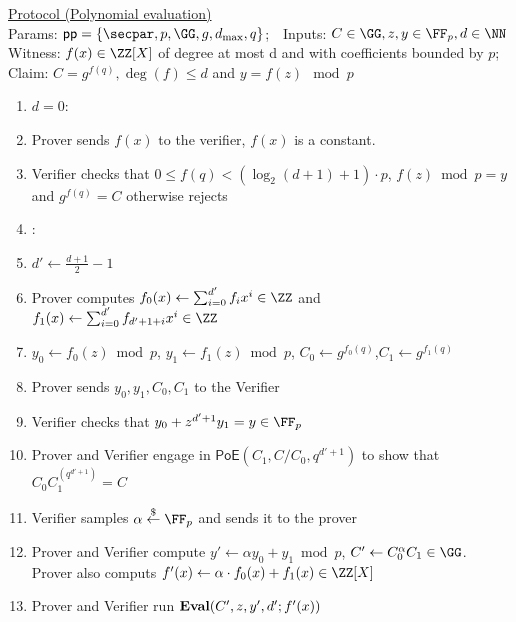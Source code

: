 \documentclass{article}
\begin{document}
\begin{small}
 \begin{minipage}{1.1\textwidth}
\begin{mdframed}[userdefinedwidth=1\textwidth]  \label{prot:Opening}
	\noindent \underline{\textsf{Protocol \eval} (Polynomial evaluation)}\\
\noindent Params: $\crs=\{\secpar,p,\GG,g,d_{\max},q\}$;\ \
Inputs: $C\in \GG,z,y\in \FF_p,d \in \NN $\\
Witness: $f(x) \in \ZZ[X]$ of degree at most d and with coefficients bounded by $p$;\\ 
Claim: $C=g^{f(q)},\deg(f)\leq d$ and $y=f(z) \mod p$

\begin{enumerate}[nolistsep]
\item \pcif $d=0$:
\item \pcind[1] Prover sends $f(x)$ to the verifier, $f(x)$ is a constant. 
\item \pcind[1] Verifier checks that $0\leq f(q)< (\log_2(d+1)+1)\cdot p$,  $f(z) \bmod p=y$ and $g^{f(q)}=C$ otherwise rejects
\item \pcelse: 
\item \pcind[1] $d'\gets \frac{d+1}{2}-1$
\item \pcind[1] Prover computes $f_0(x)\gets\sum_{i=0}^{d'} f_i x^i\in \ZZ$ and $f_1(x)\gets\sum_{i=0}^{d'} f_{d'+1+i} x^{i}\in \ZZ$
\item \pcind[1] $y_0\gets f_0(z) \bmod p$, $y_1\gets f_1(z)\bmod p$, $C_0\gets g^{f_0(q)}$,$C_1\gets g^{f_1(q)}$
\item \pcind[1] Prover sends $y_0,y_1,C_0,C_1$ to the Verifier
\item \pcind[1] Verifier checks that $y_0+z^{d'+1} y_1=y\in \FF_p$ 
\item \pcind[1] Prover and Verifier engage in $\textsf{PoE}(C_1,C/C_0,q^{d'+1})$ to show that $C_0C_1^{(q^{d'+1})}=C$
\item \pcind[1] Verifier samples $\alpha \sample \FF_p$ and sends it to the prover
\item \pcind[1] Prover and Verifier compute $y'\gets\alpha y_0 +y_1 \bmod p$, $C'\gets C_0^{\alpha}C_1 \in \GG$. \\Prover also computs $f'(x)\gets\alpha  \cdot f_0(x)+f_1(x) \in \ZZ[X]$ 
\item \pcind[1] Prover and Verifier run $\textbf{{Eval}}(C',z,y',d';f'(x))$
\end{enumerate}
\end{mdframed}
\end{minipage}
\end{small}
\end{document}
